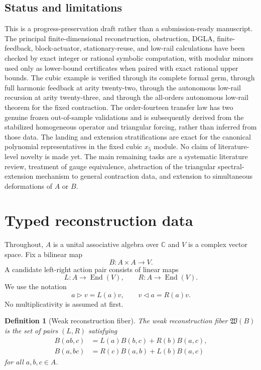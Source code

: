 \documentclass[11pt]{amsart}
\newtheorem{definition}[theorem]{Definition}
\newcommand{\End}{\operatorname{End}}
\newcommand{\Wfib}{\mathfrak W}
\newcommand{\C}{\mathbb C}
\begin{document}
\subsection*{Status and limitations}
This is a progress-preservation draft rather than a submission-ready manuscript.  The principal finite-dimensional reconstruction, obstruction, DGLA, finite-feedback, block-actuator, stationary-reuse, and low-rail calculations have been checked by exact integer or rational symbolic computation, with modular minors used only as lower-bound certificates when paired with exact rational upper bounds.  The cubic example is verified through its complete formal germ, through full harmonic feedback at arity twenty-two, through the autonomous low-rail recursion at arity twenty-three, and through the all-orders autonomous low-rail theorem for the fixed contraction.  The order-fourteen transfer law has two genuine frozen out-of-sample validations and is subsequently derived from the stabilized homogeneous operator and triangular forcing, rather than inferred from those data.  The landing and extension stratifications are exact for the canonical polynomial representatives in the fixed cubic $x_5$ module.  No claim of literature-level novelty is made yet.  The main remaining tasks are a systematic literature review, treatment of gauge equivalence, abstraction of the triangular spectral-extension mechanism to general contraction data, and extension to simultaneous deformations of $A$ or $B$.

\section{Typed reconstruction data}

Throughout, $A$ is a unital associative algebra over $\C$ and $V$ is a complex vector space.  Fix a bilinear map
\[
B:A\times A\longrightarrow V.
\]
A candidate left-right action pair consists of linear maps
\[
L:A\longrightarrow\End(V),
\qquad
R:A\longrightarrow\End(V).
\]
We use the notation
\[
a\triangleright v=L(a)v,
\qquad
v\triangleleft a=R(a)v.
\]
No multiplicativity is assumed at first.

\begin{definition}[Weak reconstruction fiber]
The weak reconstruction fiber $\Wfib(B)$ is the set of pairs $(L,R)$ satisfying
\begin{align}
B(ab,c)&=L(a)B(b,c)+R(b)B(a,c), \label{eq:weak-left}\\
B(a,bc)&=R(c)B(a,b)+L(b)B(a,c) \label{eq:weak-right}
\end{align}
for all $a,b,c\in A$.
\end{definition}
\end{document}
